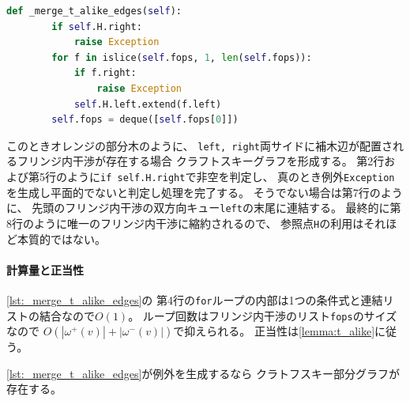 \begin{lstlisting}[language=Python, caption=\_merge\_t\_alike\_edges,escapechar=@,
                   label=lst:_merge_t_alike_edges]
    def _merge_t_alike_edges(self):
        if self.H.right:
            raise Exception
        for f in islice(self.fops, 1, len(self.fops)):
            if f.right:
                raise Exception
            self.H.left.extend(f.left)
        self.fops = deque([self.fops[0]])
\end{lstlisting}



このときオレンジの部分木のように、
{\tt left, right}両サイドに補木辺が配置されるフリンジ内干渉が存在する場合
クラフトスキーグラフを形成する。
第2行および第5行のように{\tt if self.H.right}で非空を判定し、
真のとき例外{\tt Exception}を生成し平面的でないと判定し処理を完了する。
そうでない場合は第7行のように、
先頭のフリンジ内干渉の双方向キュー{\tt left}の末尾に連結する。
最終的に第8行のように唯一のフリンジ内干渉に縮約されるので、
参照点{\tt H}の利用はそれほど本質的ではない。

\paragraph{計算量と正当性}
\lstrefname\ref{lst:_merge_t_alike_edges}の
第4行の{\tt for}ループの内部は1つの条件式と連結リストの結合なので$O(1)$。
ループ回数はフリンジ内干渉のリスト{\tt fops}のサイズなので
$O(|\omega^+(v)|+|\omega^-(v)|)$で抑えられる。
正当性は\cref{lemma:t_alike}に従う。

\begin{lemma}
\label{lemma:t_alike}
\lstrefname\ref{lst:_merge_t_alike_edges}が例外を生成するなら
クラトフスキー部分グラフが存在する。
\end{lemma}




